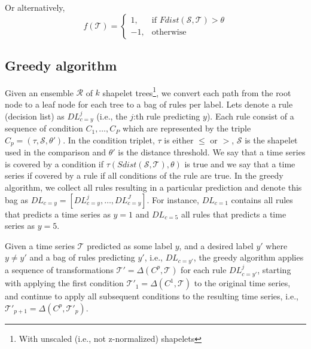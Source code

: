 \documentclass[smallextended,natbib]{svjour3}
\begin{document}
Or alternatively, 
\begin{equation}
f(\mathcal{T}) = 
\begin{cases}
    1,& \text{if } Fdist(\mathcal{S}, \mathcal{T}) > \theta\\
    -1,              & \text{otherwise}
\end{cases}
\end{equation}

\subsection{Greedy algorithm}

Given an ensemble $\mathcal{R}$ of $k$ shapelet trees\footnote{With unscaled (i.e., not z-normalized) shapelets}, we convert each path from the root node to a leaf node for each tree to a bag of rules per label. Lets denote a rule (decision list) as $DL^j_{c=y}$ (i.e., the $j$:th rule predicting $y$). Each rule consist of a sequence of condition $C_1,\ldots,C_P$ which are represented by the triple $C_p=(\tau, \mathcal{S}, \theta')$. In the condition triplet, $\tau$ is either $\leq$ or $>$, $\mathcal{S}$ is the shapelet used in the comparison and $\theta'$ is the distance threshold. We say that a time series is covered by a condition if $\tau(Sdist(\mathcal{S}, \mathcal{T}), \theta)$ is true and we say that a time series if covered by a rule if all conditions of the rule are true. In the greedy algorithm, we collect all rules resulting in a particular prediction and denote this bag as $DL_{c=y}=[DL^{j}_{c=y},\ldots,DL^{J}_{c=y}]$. For instance, $DL_{c=1}$ contains all rules that predicts a time series as $y=1$ and $DL_{c=5}$ all rules that predicts a time series as $y=5$.

Given a time series $\mathcal{T}$ predicted as some label $y$, and a desired label $y'$ where $y \neq y'$ and a bag of rules predicting $y'$, i.e., $DL_{c=y'}$, the greedy algorithm applies a sequence of transformations $\mathcal{T}' = \Delta(C^p, \mathcal{T})$ for each rule $DL^j_{c=y'}$, starting with applying the first condition $\mathcal{T}'_1 = \Delta(C^1, \mathcal{T})$ to the original time series, and continue to apply all subsequent conditions to the resulting time series, i.e., $\mathcal{T}'_{p+1} = \Delta(C^p, \mathcal{T}'_{p})$.
\end{document}
